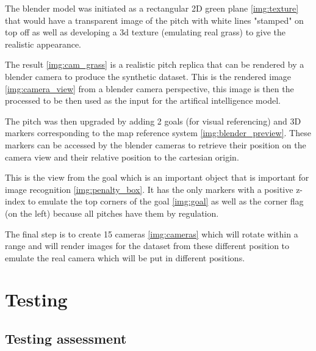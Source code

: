 \documentclass[
    11pt,
    oneside
]{report}
\begin{document}
The blender model was initiated as a rectangular 2D green plane \ref{img:texture} that would have a transparent image of the pitch with white lines "stamped" on top off as well as developing a 3d texture (emulating real grass) to give the realistic appearance.



The result \ref{img:cam_grass} is a realistic pitch replica that can be rendered by a blender camera to produce the synthetic dataset. This is the rendered image \ref{img:camera_view} from a blender camera perspective, this image is then the processed to be then used as the input for the artifical intelligence model.



The pitch was then upgraded by adding 2 goals (for visual referencing) and 3D markers corresponding to the map reference system \ref{img:blender_preview}. These markers can be accessed by the blender cameras to retrieve their position on the camera view and their relative position to the cartesian origin.



This is the view from the goal which is an important object that is important for image recognition \ref{img:penalty_box}. It has the only markers with a positive z-index to emulate the top corners of the goal \ref{img:goal} as well as the corner flag (on the left) because all pitches have them by regulation.



The final step is to create 15 cameras \ref{img:cameras} which will rotate within a range and will render images for the dataset from these different position to emulate the real camera which will be put in different positions.





\chapter{Testing}



\section{Testing assessment}
\end{document}
